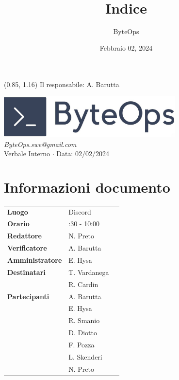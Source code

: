 \documentclass{article}
\title{\textbf{\fontsize{28}{6}\selectfont Indice}}
\author{\fontsize{14}{6}\selectfont ByteOps}
\date{Febbraio 02, 2024}
\begin{document}
\begin{textblock*}{\textwidth}(0.85\textwidth, 1.16\textheight)
    Il responsabile: A. Barutta
\end{textblock*}

\pagestyle{fancy}
\begin{center}
\includegraphics[width = 0.7\textwidth]{../../Images/logo.png} \\
\vspace{0.2cm}
\textcolor[RGB]{60, 60, 60}{\textit{ByteOps.swe@gmail.com}} \\
\vspace{1cm}
\fontsize{16}{6}\selectfont Verbale Interno $\cdot$ Data: 02/02/2024 \\
\vspace{0.5cm}
\end{center}

\section*{Informazioni documento}
\def\arraystretch{1.2}
\begin{tabular}{>{\raggedleft\arraybackslash}p{}|>{\raggedright\arraybackslash}p{}c}
    \hline
    \addlinespace
    \textbf{Luogo} & Discord \vspace{10pt} \\
    \textbf{Orario} & 9:30 - 10:00 \vspace{10pt} \\
    \textbf{Redattore} & N. Preto \vspace{10pt} \\
    \textbf{Verificatore} & A. Barutta \vspace{10pt} \\
    \textbf{Amministratore} & E. Hysa \vspace{10pt} \\
    \textbf{Destinatari} & T. Vardanega \\ & R. Cardin \vspace{10pt} \\
    \textbf{Partecipanti} & A. Barutta \\ & E. Hysa \\ & R. Smanio \\ & D. Diotto \\ & F. Pozza \\ & L. Skenderi \\ & N. Preto \vspace{10pt} \\
\end{tabular}
\pagebreak 
\end{document}

